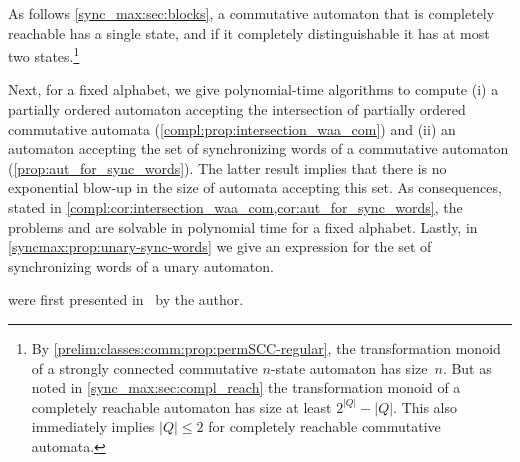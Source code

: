 
As follows \cref{sync_max:sec:blocks},
a commutative automaton that is completely reachable
has a single state, and if it completely distinguishable
it has at most two states.\footnote{By \cref{prelim:classes:comm:prop:permSCC-regular},
	the transformation monoid of a strongly connected commutative $n$-state	automaton has size~$n$.	
	But as noted in \cref{sync_max:sec:compl_reach} the transformation monoid of a completely reachable automaton
	has size at least $2^{|Q|} - |Q|$. This also immediately implies $|Q| \le 2$ for completely reachable commutative automata.}

Next, for a fixed alphabet, we give polynomial-time algorithms to compute (i) a partially ordered automaton accepting the intersection of partially ordered commutative automata (\cref{compl:prop:intersection_waa_com}) and (ii) an automaton accepting the set of synchronizing words of a commutative automaton (\cref{prop:aut_for_sync_words}). The latter result implies that there is no exponential blow-up in the size of automata accepting this set. 
As consequences, stated in \cref{compl:cor:intersection_waa_com,cor:aut_for_sync_words},
the problems \DFAINT and \DFASWS are solvable in polynomial time for a fixed alphabet.
Lastly, in \cref{syncmax:prop:unary-sync-words} we give an expression for the set of synchronizing words of a unary automaton.

were first presented in~\cite[Prop.~41 \& Lem.~43]{DBLP:journals/tcs/Hoffmann21} by the author.

